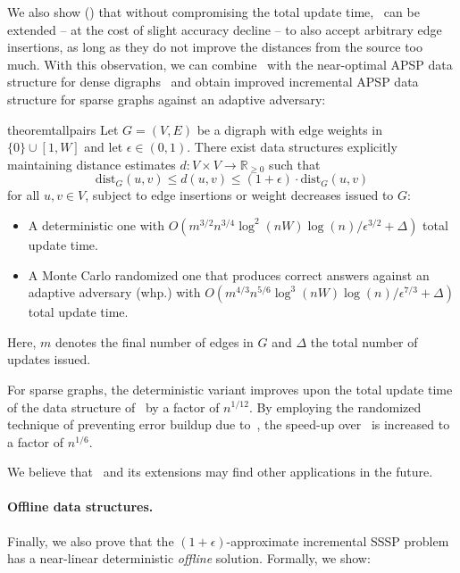 \documentclass[11pt,letterpaper]{article}
\theoremstyle{plain}
\newcommand{\eps}{\ensuremath{\epsilon}}
\newcommand{\dist}{\mathrm{dist}}
\begin{document}
We also show () that without compromising the total update time,~ can be extended -- at the cost of slight accuracy decline -- to also accept arbitrary edge insertions, as long as they do not improve the distances from the source too much.
With this observation, we can combine~ with the near-optimal APSP data structure for dense digraphs~\cite{KarczmarzL20} and obtain improved incremental APSP data structure for sparse graphs against an adaptive adversary:
\begin{restatable}{theorem}{tallpairs}\label{t:all-pairs}
Let $G=(V,E)$ be a digraph with edge weights in $\{0\}\cup [1,W]$ and let $\eps\in (0,1)$. There exist data structures explicitly
maintaining distance estimates $d:V\times V\to\mathbb{R}_{\geq 0}$ such that
\[ \dist_G(u,v)\leq d(u,v)\leq (1+\eps)\cdot\dist_G(u,v) \]
for all $u,v\in V$,
subject to edge insertions or weight decreases issued to $G$:
\begin{itemize}
  \item A deterministic one with $O(m^{3/2}n^{3/4}\log^2(nW)\log(n)/\eps^{3/2}+\Delta)$ total update time.
  \item A Monte Carlo randomized one that produces correct answers against an adaptive adversary (whp.)
    with $O(m^{4/3}n^{5/6}\log^3(nW)\log(n)/\eps^{7/3}+\Delta)$ total update time.
\end{itemize}
Here, $m$ denotes the final number of edges in $G$ and $\Delta$ the total number of updates issued.
\end{restatable}
For sparse graphs, the deterministic variant improves upon the total update time of the data structure of~\cite{KarczmarzL19} by a factor of $n^{1/12}$.
By employing the randomized technique of preventing error buildup due to~\cite{ChechikZ21}, the speed-up over~\cite{KarczmarzL19} is increased to a factor of $n^{1/6}$.

We believe that~ and its extensions may find other applications in the future. 

\paragraph{Offline data structures.} Finally, we also prove that the $(1+\eps)$-approximate incremental SSSP problem has a near-linear deterministic \emph{offline} solution. Formally, we show:
\end{document}
